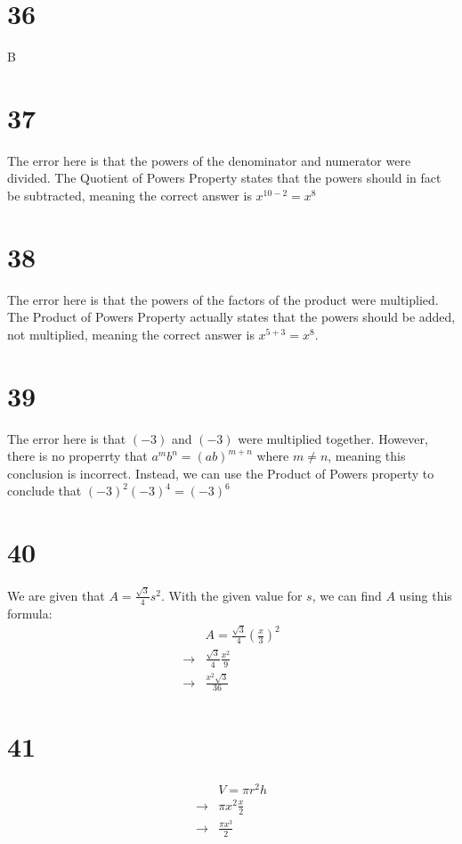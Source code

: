 \documentclass{article}
\theoremstyle{definition}
\begin{document}
\section*{36}
B

\section*{37}
The error here is that the powers of the denominator and numerator were divided. The Quotient of Powers Property states that the powers should in 
fact be subtracted, meaning the correct answer is $x^{10-2}=x^8$

\section*{38}
The error here is that the powers of the factors of the product were multiplied. The Product of Powers Property actually states that the powers should be 
added, not multiplied, meaning the correct answer is $x^{5+3}=x^8$.

\section*{39}
The error here is that $(-3)$ and $(-3)$ were multiplied together. However, there is no properrty that $a^m b^n=(ab)^{m+n}$ where $m\ne n$, meaning 
this conclusion is incorrect. Instead, we can use the Product of Powers property to conclude that $(-3)^2(-3)^4=(-3)^6$

\section*{40}
We are given that $A=\frac{\sqrt{3}}{4}s^2$. With the given value for $s$, we can find $A$ using this formula:
\[
\begin{array}{rl}
            & A=\frac{\sqrt{3}}{4}(\frac{x}{3})^2 \\
\rightarrow & \frac{\sqrt{3}}{4}\frac{x^2}{9} \\
\rightarrow & \frac{x^2\sqrt{3}}{36}
\end{array}
\]

\section*{41}
\[
\begin{array}{rl}
            & V=\pi r^2h \\
\rightarrow & \pi x^2\frac{x}{2} \\
\rightarrow & \frac{\pi x^3}{2}
\end{array}
\]
\end{document}
